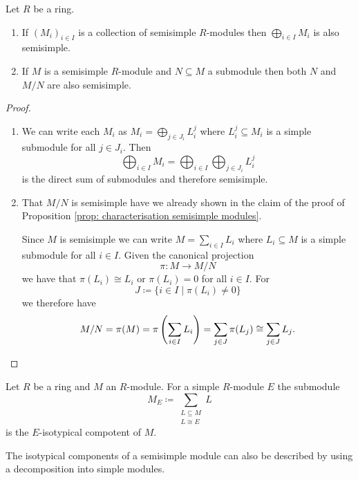 \begin{lem}\label{lem: inherit semisimple}
 Let $R$ be a ring.
 \begin{enumerate}[label=\emph{\alph*)},leftmargin=*]
  \item
   If $(M_i)_{i \in I}$ is a collection of semisimple $R$-modules then $\bigoplus_{i \in I} M_i$ is also semisimple.
  \item
   If $M$ is a semisimple $R$-module and $N \subseteq M$ a submodule then both $N$ and $M/N$ are also semisimple.
 \end{enumerate}
\end{lem}
\begin{proof}
 \begin{enumerate}[label=\emph{\alph*)},leftmargin=*]
  \item
   We can write each $M_i$ as $M_i = \bigoplus_{j \in J_i} L^j_i$ where $L^j_i \subseteq M_i$ is a simple submodule for all $j \in J_i$. Then
   \[
    \bigoplus_{i \in I} M_i = \bigoplus_{i \in I} \bigoplus_{j \in J_i} L^j_i
   \]
   is the direct sum of submodules and therefore semisimple.
  \item
   That $M/N$ is semisimple have we already shown in the claim of the proof of Proposition \ref{prop: characterisation semisimple modules}.
   
   Since $M$ is semisimple we can write $M = \sum_{i \in I} L_i$ where $L_i \subseteq M$ is a simple submodule for all $i \in I$. Given the canonical projection
   \[
    \pi \colon M \to M/N
   \]
   we have that $\pi(L_i) \cong L_i$ or $\pi(L_i) = 0$ for all $i \in I$. For
   \[
    J \coloneqq \{i \in I \mid \pi(L_i) \neq 0\}
   \]
   we therefore have
   \[
    M/N = \pi(M) = \pi\left( \sum_{i \in I} L_i \right) = \sum_{j \in J} \pi(L_j) \cong \sum_{j \in J} L_j.
    \qedhere
   \]
 \end{enumerate}
\end{proof}


\begin{defi}
 Let $R$ be a ring and $M$ an $R$-module. For a simple $R$-module $E$ the submodule
 \[
  M_E \coloneqq \sum_{\substack{L \subseteq M \\ L \cong E}} L
 \]
 is the $E$-isotypical compotent of $M$.
\end{defi}


The isotypical components of a semisimple module can also be described by using a decomposition into simple modules.


